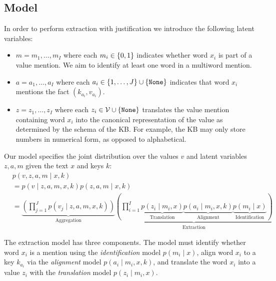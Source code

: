\documentclass[12pt]{article}
\begin{document}
\subsection{Model}
In order to perform extraction with justification we
introduce the following latent variables:
\begin{itemize}
\item $m = m_1, \ldots, m_I$ where each $m_i \in \left\{0,1\right\}$
    indicates whether word $x_i$ is part of a value mention.
    We aim to identify at least one word in a multiword mention.
\item $a = a_1, \ldots, a_I$ where each $a_i \in \left\{1, \ldots, J\right\} \cup \left\{\texttt{None}\right\}$
    indicates that word $x_i$ mentions the fact $(k_{a_i}, v_{a_i})$.
\item $z = z_1, \ldots, z_I$ where each $z_i \in \mathcal{V}\cup \left\{\texttt{None}\right\}$
    translates the value mention containing word $x_i$
    into the canonical representation of
    the value as determined by the schema of the KB.
    For example, the KB may only store numbers in numerical form,
    as opposed to alphabetical.
\end{itemize}

Our model specifies the joint distribution over the values $v$ and latent variables $z,a,m$
given the text $x$ and keys $k$:
\begin{equation}
\label{eqn:prob}
\begin{aligned}
&p(v,z,a,m\mid x,k)\\
&= p(v\mid z,a,m,x,k)p(z,a,m\mid x,k)\\
&= \underbrace{\left(\prod_{j=1}^J p(v_j\mid z,a,m,x,k)\right)}_{\textrm{Aggregation}}
    \underbrace{\left(\prod_{i=1}^I
        \underbrace{p(z_i\mid m_i,x)}_{\textrm{Translation}}
        \underbrace{p(a_i\mid m_i,x,k)}_{\textrm{Alignment}}
        \underbrace{p(m_i\mid x)}_{\textrm{Identification}}
    \right)}_{\textrm{Extraction}}
\end{aligned}
\end{equation}

The extraction model has three components.
The model must identify whether word $x_i$
is a mention using the \textit{identification} model $p(m_i \mid x)$,
align word $x_i$ to a key $k_{a_i}$ via the \textit{alignment} model $p(a_i \mid m_i, x, k)$,
and translate the word $x_i$ into a value $z_i$ with the
\textit{translation} model $p(z_i \mid m_i, x)$.
\end{document}
